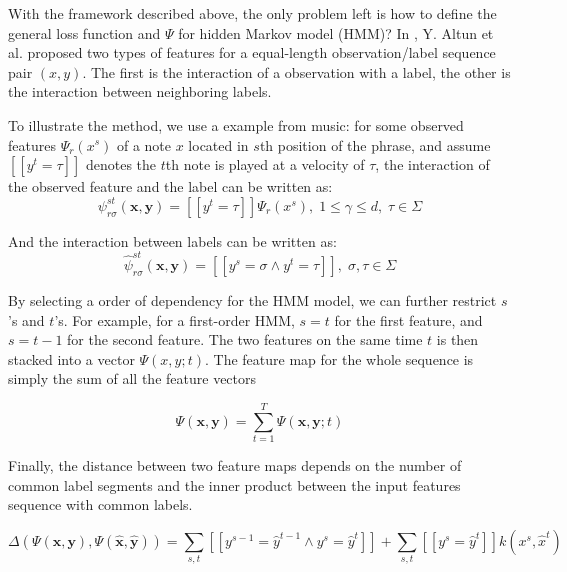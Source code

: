 With the framework described above, the only problem left is how to define the general loss function and $\Psi$ for hidden Markov model (HMM)? In \cite{svm2003}, Y. Altun et al. proposed two types of features for a equal-length observation/label sequence pair $(x,y)$. The first is the interaction of a observation with a label, the other is the interaction between neighboring labels. 


To illustrate the method, we use a example from music: for some observed features $\Psi_r(x^s)$ of a note $x$ located in $s$th position of the phrase, and assume $\left[ \left[ y^t = \tau \right] \right]$ denotes the $t$th note is played at a velocity of $\tau$, the interaction of the observed feature and the label can be written as:
$$\psi^{st}_{r\sigma}(\mathbf{x}, \mathbf{y}) = \left[\left[y^t = \tau \right] \right]\Psi_r(x^s),\; 1\leq\gamma\leq d,\; \tau \in \Sigma $$

And the interaction between labels can be written as:
$$\hat{\psi}^{st}_{r\sigma}(\mathbf{x}, \mathbf{y}) = \left[\left[y^s = \sigma \wedge y^t = \tau \right] \right],\; \sigma, \tau \in \Sigma $$

By selecting a order of dependency for the HMM model, we can further restrict $s$'s and $t$'s. For example, for a first-order HMM, $s = t$ for the first feature, and $s = t-1$ for the second feature. The two features on the same time $t$ is then stacked into a vector $\Psi(x,y;t)$. The feature map for the whole sequence is simply the sum of all the feature vectors 

$$\Psi(\mathbf{x}, \mathbf{y}) = \sum^T_{t=1}\Psi(\mathbf{x}, \mathbf{y};t)$$

Finally, the distance between two feature maps depends on the number of common label segments and the inner product between the input features sequence with common labels.


$$\Delta(\Psi(\mathbf{x}, \mathbf{y}), \Psi(\mathbf{\hat{x}}, \mathbf{\hat{y}})) = \sum_{s,t}\left[\left[y^{s-1} = \hat{y}^{t-1}\wedge y^s = \hat{y}^t\right] \right] + \sum_{s,t}\left[\left[y^{s} = \hat{y}^{t}\right] \right]k(x^s, \hat{x}^t)$$


